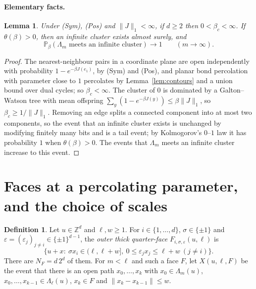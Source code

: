 \documentclass[11pt]{article}
\newtheorem{lemma}[theorem]{Lemma}
\theoremstyle{definition}
\newtheorem{definition}[theorem]{Definition}
\theoremstyle{remark}
\numberwithin{equation}{section}
\newcommand{\Z}{\mathbb Z}
\newcommand{\Pp}{\mathbb P}
\newcommand{\1}{\mathbf 1}
\newcommand{\Lam}{\Lambda}
\newcommand{\norm}[1]{\|#1\|}
\begin{document}
\paragraph{Elementary facts.}
\begin{lemma}\label{lem:basic}
Under \textup{(Sym)}, \textup{(Pos)} and $\norm{J}_1<\infty$, if $d\ge2$ then $0<\beta_c<\infty$.
If $\theta(\beta)>0$, then an infinite cluster exists almost surely, and
\begin{equation}\label{eq:seed-infinite}
\Pp_\beta(\Lam_m\text{ meets an infinite cluster})\to1\qquad(m\to\infty).
\end{equation}
\end{lemma}
\begin{proof}
The nearest-neighbour pairs in a coordinate plane are open independently with probability
$1-e^{-\beta J(e_1)}$, by (Sym) and (Pos), and planar bond percolation with parameter close to $1$
percolates by Lemma~\ref{lem:contours} and a union bound over dual cycles; so $\beta_c<\infty$. The
cluster of $0$ is dominated by a Galton--Watson tree with mean offspring
$\sum_y(1-e^{-\beta J(y)})\le\beta\norm{J}_1$, so $\beta_c\ge1/\norm{J}_1$. Removing an edge
splits a connected component into at most two components, so the event that an infinite cluster
exists is unchanged by modifying finitely many bits and is a tail event; by Kolmogorov's
$0$--$1$ law it has probability $1$ when $\theta(\beta)>0$. The events that $\Lam_m$ meets an
infinite cluster increase to this event.
\end{proof}

\section{Faces at a percolating parameter, and the choice of scales}\label{sec:faces}

\begin{definition}\label{def:faces}
Let $u\in\Z^d$ and $\ell,w\ge1$. For $i\in\{1,\dots,d\}$, $\sigma\in\{\pm1\}$ and
$\varepsilon=(\varepsilon_j)_{j\ne i}\in\{\pm1\}^{d-1}$, the \emph{outer thick quarter-face}
$F_{i,\sigma,\varepsilon}(u,\ell)$ is
\[
\bigl\{u+x:\ \sigma x_i\in(\ell,\ell+w],\ 0\le\varepsilon_jx_j\le\ell+w\ (j\ne i)\bigr\}.
\]
There are $N_F=d\,2^d$ of them. For $m<\ell$ and such a face $F$, let $X(u,\ell,F)$ be the event
that there is an open path $x_0,\dots,x_k$ with $x_0\in\Lam_m(u)$, $x_0,\dots,x_{k-1}\in\Lam_\ell(u)$,
$x_k\in F$ and $\norm{x_k-x_{k-1}}\le w$.
\end{definition}
\end{document}
